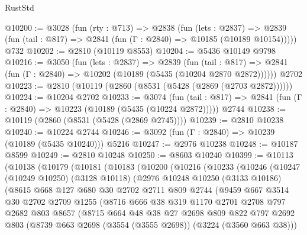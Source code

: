 \begin{lexlean}{RustStd}
\begin{coremodule}
@10200 := @3028
    (fun (rty : @713) =>
    @2838
      (fun (lets : @2837) =>
      @2839 (fun (tail : @817) => @2841 (fun (Γ : @2840) => @10185 (@10189 @10154)))))
    @732
@10202 := @2810 (@10119 @8553)
@10204 := @5436 @10149 @9798
@10216 := @3050
    (fun (lets : @2837) =>
    @2839
      (fun (tail : @817) =>
      @2841 (fun (Γ : @2840) => @10202 (@10189 (@5435 (@10204 @2870 @2872))))))
    @2702
@10223 := @2810 (@10119 (@2860 (@8531 (@5428 (@2869 (@2703 @2872))))))
@10224 := @10204 @2702
@10233 := @3074
    (fun (tail : @817) => @2841 (fun (Γ : @2840) => @10223 (@10189 (@5435 (@10224 @2872)))))
    @2744
@10238 := @10119 (@2860 (@8531 (@5428 (@2869 @2745))))
@10239 := @2810 @10238
@10240 := @10224 @2744
@10246 := @3092 (fun (Γ : @2840) => @10239 (@10189 (@5435 @10240))) @5216
@10247 := @2976 @10238
@10248 := @10187 @8599
@10249 := @2810 @10248
@10250 := @8603 @10240
@10399 := @10113
    (@10138
      (@10179
        (@10181
          (@10183
            (@10200
              (@10216
                (@10233
                  (@10246
                    (@10247
                      (@10249 @10250)
                      (@3128 @10118)
                      (@2976
                        @10248
                        @10250
                        (@3133 @10186)
                        (@8615
                          @668
                          @127
                          @680
                          @30
                          @2702
                          @2711
                          @809
                          @2744
                          (@9459
                            @667
                            @3514
                            @30
                            @2702
                            @2709
                            @1255
                            (@8716
                              @666
                              @38
                              @319
                              @1170
                              @2701
                              @2708
                              @797
                              @2682
                              @803
                              @8657
                              (@8715
                                @664
                                @48
                                @38
                                @27
                                @2698
                                @809
                                @822
                                @797
                                @2692
                                @803
                                (@8739 @663 @2698 (@3554 (@3555 @2698)) (@3224 (@3560 @663 @38)))

\end{coremodule}
\end{lexlean}
